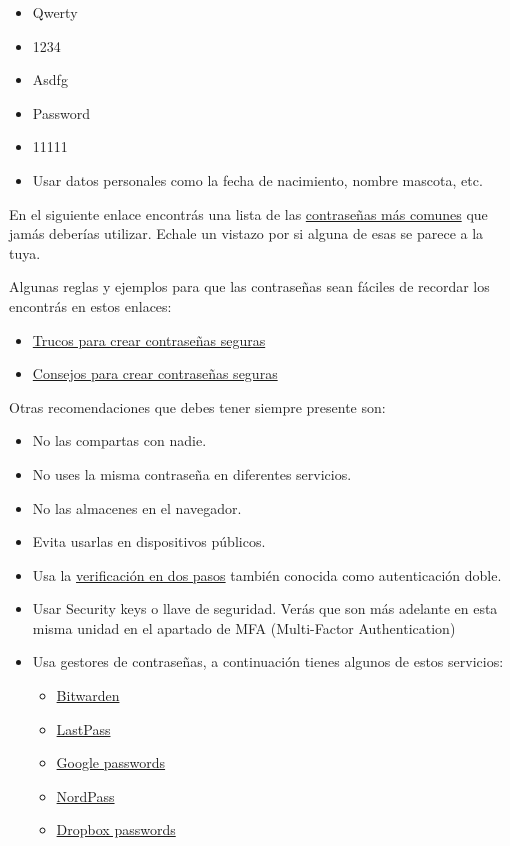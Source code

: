 \documentclass[
  spanish,
  a4paper,
  openany]{book}
\providecommand{\tightlist}{%
  \setlength{\itemsep}{0pt}\setlength{\parskip}{0pt}}
\begin{document}
\begin{itemize}
\item
  Qwerty
\item
  1234
\item
  Asdfg
\item
  Password
\item
  11111
\item
  Usar datos personales como la fecha de nacimiento, nombre mascota, etc.
\end{itemize}

En el siguiente enlace encontrás una lista de las \href{https://nordpass.com/most-common-passwords-list/}{contraseñas más comunes} que jamás deberías utilizar. Echale un vistazo por si alguna de esas se parece a la tuya.

Algunas reglas y ejemplos para que las contraseñas sean fáciles de recordar los encontrás en estos enlaces:

\begin{itemize}
\item
  \href{https://www.pandasecurity.com/es/mediacenter/seguridad/10-trucos-para-crear-contrasenas-seguras/}{Trucos para crear contraseñas seguras}
\item
  \href{https://www.genbeta.com/seguridad/especial-contrasenas-seguras-consejos-para-mejorar-la-seguridad-de-tus-contrasenas}{Consejos para crear contraseñas seguras}
\end{itemize}

Otras recomendaciones que debes tener siempre presente son:

\begin{itemize}
\item
  No las compartas con nadie.
\item
  No uses la misma contraseña en diferentes servicios.
\item
  No las almacenes en el navegador.
\item
  Evita usarlas en dispositivos públicos.
\item
  Usa la \href{https://www.osi.es/es/actualidad/blog/2019/02/27/el-factor-de-autenticacion-doble-y-multiple}{verificación en dos pasos} también conocida como autenticación doble.
\item
  Usar Security keys o llave de seguridad. Verás que son más adelante en esta misma unidad en el apartado de MFA (Multi-Factor Authentication)
\item
  Usa gestores de contraseñas, a continuación tienes algunos de estos servicios:

  \begin{itemize}
  \tightlist
  \item
    \href{https://bitwarden.com/}{Bitwarden}
  \item
    \href{https://www.lastpass.com/es/}{LastPass}
  \item
    \href{https://passwords.google.com/}{Google passwords}
  \item
    \href{https://nordpass.com/homepage/}{NordPass}
  \item
    \href{https://www.dropbox.com/es_ES/features/security/passwords}{Dropbox passwords}
  \end{itemize}
\end{itemize}
\end{document}
